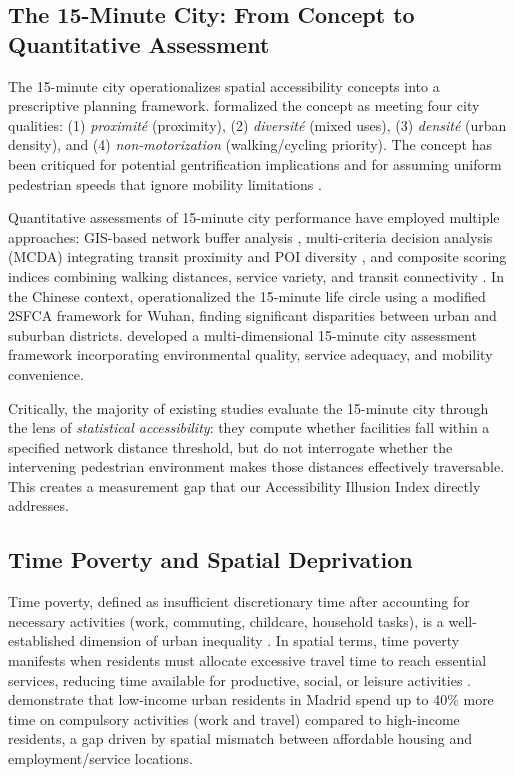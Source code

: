 \documentclass[preprint,12pt,authoryear]{elsarticle}
\begin{document}
\subsection{The 15-Minute City: From Concept to Quantitative Assessment}
\label{sec:15min_review}

The 15-minute city operationalizes spatial accessibility concepts into a prescriptive planning framework. \citet{moreno202115minute} formalized the concept as meeting four city qualities: (1) \emph{proximit\'e} (proximity), (2) \emph{diversit\'e} (mixed uses), (3) \emph{densit\'e} (urban density), and (4) \emph{non-motorization} (walking/cycling priority). The concept has been critiqued for potential gentrification implications \citep{angel202115} and for assuming uniform pedestrian speeds that ignore mobility limitations \citep{hadgalagic2023examining}.

Quantitative assessments of 15-minute city performance have employed multiple approaches: GIS-based network buffer analysis \citep{mu2022understanding}, multi-criteria decision analysis (MCDA) integrating transit proximity and POI diversity \citep{oliveira2021towards}, and composite scoring indices combining walking distances, service variety, and transit connectivity \citep{allam2022operationalising}. In the Chinese context, \citet{zhang2021operationalizing} operationalized the 15-minute life circle using a modified 2SFCA framework for Wuhan, finding significant disparities between urban and suburban districts. \citet{zhang2023multi} developed a multi-dimensional 15-minute city assessment framework incorporating environmental quality, service adequacy, and mobility convenience.

Critically, the majority of existing studies evaluate the 15-minute city through the lens of \emph{statistical accessibility}: they compute whether facilities fall within a specified network distance threshold, but do not interrogate whether the intervening pedestrian environment makes those distances effectively traversable. This creates a measurement gap that our Accessibility Illusion Index directly addresses.

\subsection{Time Poverty and Spatial Deprivation}
\label{sec:time_poverty_review}

Time poverty, defined as insufficient discretionary time after accounting for necessary activities (work, commuting, childcare, household tasks), is a well-established dimension of urban inequality \citep{vickery1977time, burton2000time, cornelissen2018connecting}. In spatial terms, time poverty manifests when residents must allocate excessive travel time to reach essential services, reducing time available for productive, social, or leisure activities \citep{su2019time}. \citet{serrano2014time} demonstrate that low-income urban residents in Madrid spend up to 40\% more time on compulsory activities (work and travel) compared to high-income residents, a gap driven by spatial mismatch between affordable housing and employment/service locations.
\end{document}
